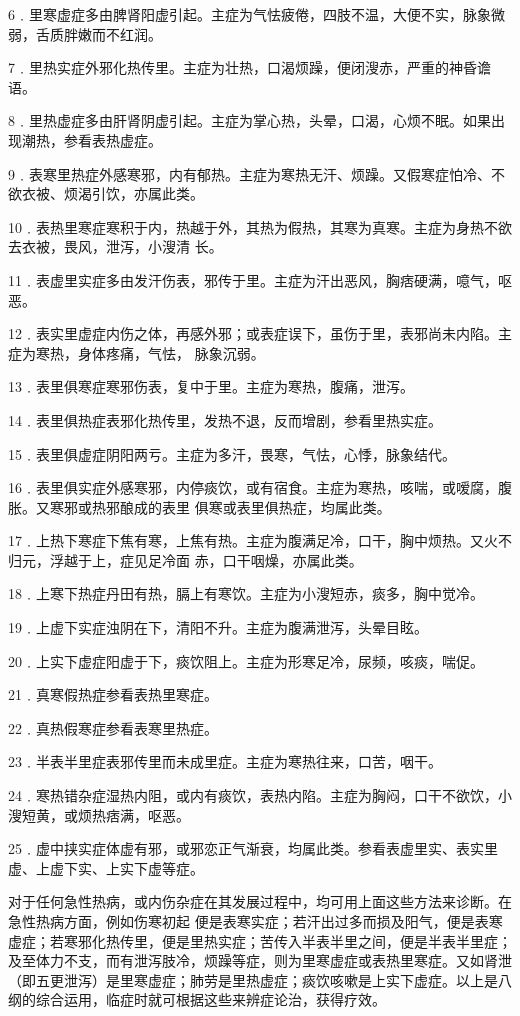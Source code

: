 \documentclass[12pt,UTF8]{ctexbook}
\begin{document}
6﹒里寒虚症多由脾肾阳虚引起。主症为气怯疲倦，四肢不温，大便不实，脉象微弱，舌质胖嫩而不红润。

7﹒里热实症外邪化热传里。主症为壮热，口渴烦躁，便闭溲赤，严重的神昏谵语。

8﹒里热虚症多由肝肾阴虚引起。主症为掌心热，头晕，口渴，心烦不眠。如果出现潮热，参看表热虚症。

9﹒表寒里热症外感寒邪，内有郁热。主症为寒热无汗、烦躁。又假寒症怕冷、不欲衣被、烦渴引饮，亦属此类。

10﹒表热里寒症寒积于内，热越于外，其热为假热，其寒为真寒。主症为身热不欲去衣被，畏风，泄泻，小溲清
长。

11﹒表虚里实症多由发汗伤表，邪传于里。主症为汗出恶风，胸痞硬满，噫气，呕恶。

12﹒表实里虚症内伤之体，再感外邪；或表症误下，虽伤于里，表邪尚未内陷。主症为寒热，身体疼痛，气怯，
脉象沉弱。

13﹒表里俱寒症寒邪伤表，复中于里。主症为寒热，腹痛，泄泻。

14﹒表里俱热症表邪化热传里，发热不退，反而增剧，参看里热实症。

15﹒表里俱虚症阴阳两亏。主症为多汗，畏寒，气怯，心悸，脉象结代。

16﹒表里俱实症外感寒邪，内停痰饮，或有宿食。主症为寒热，咳喘，或嗳腐，腹胀。又寒邪或热邪酿成的表里
俱寒或表里俱热症，均属此类。

17﹒上热下寒症下焦有寒，上焦有热。主症为腹满足冷，口干，胸中烦热。又火不归元，浮越于上，症见足冷面
赤，口干咽燥，亦属此类。

18﹒上寒下热症丹田有热，膈上有寒饮。主症为小溲短赤，痰多，胸中觉冷。

19﹒上虚下实症浊阴在下，清阳不升。主症为腹满泄泻，头晕目眩。

20﹒上实下虚症阳虚于下，痰饮阻上。主症为形寒足冷，尿频，咳痰，喘促。

21﹒真寒假热症参看表热里寒症。

22﹒真热假寒症参看表寒里热症。

23﹒半表半里症表邪传里而未成里症。主症为寒热往来，口苦，咽干。

24﹒寒热错杂症湿热内阻，或内有痰饮，表热内陷。主症为胸闷，口干不欲饮，小溲短黄，或烦热痞满，呕恶。

25﹒虚中挟实症体虚有邪，或邪恋正气渐衰，均属此类。参看表虚里实、表实里虚、上虚下实、上实下虚等症。

对于任何急性热病，或内伤杂症在其发展过程中，均可用上面这些方法来诊断。在急性热病方面，例如伤寒初起
便是表寒实症；若汗出过多而损及阳气，便是表寒虚症；若寒邪化热传里，便是里热实症；苦传入半表半里之间，便是半表半里症；及至体力不支，而有泄泻肢冷，烦躁等症，则为里寒虚症或表热里寒症。又如肾泄（即五更泄泻）是里寒虚症；肺劳是里热虚症；痰饮咳嗽是上实下虚症。以上是八纲的综合运用，临症时就可根据这些来辨症论治，获得疗效。
\end{document}
